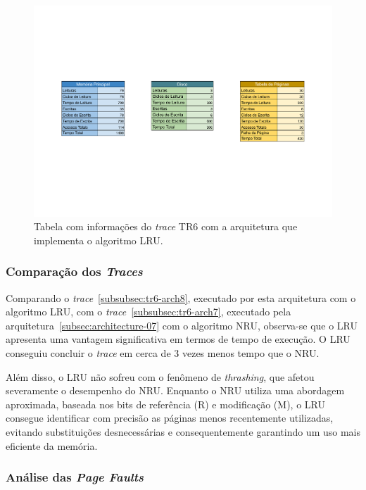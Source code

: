 \documentclass[
	12pt,				%
	oneside,   	        %
	a4paper,			%
	english,			%
	french,				%
	spanish,			%
	brazil,				%
	]{pacotes/abntex2}
\begin{document}
\begin{figure}[H]
  \centering
  \includegraphics[scale=0.5]{figuras/Architecture08-TLB(none) TR6.pdf}
  \caption{Tabela com informações do \textit{trace} TR6 com a arquitetura que implementa o algoritmo LRU.}
  \label{fig:tr6-arch08}
\end{figure}

\subsubsection{Comparação dos \textit{Traces}}
\label{subsubsec:comp-traces-arch8}

Comparando o \textit{trace}~\ref{subsubsec:tr6-arch8}, executado por esta arquitetura com o algoritmo LRU, com o \textit{trace}~\ref{subsubsec:tr6-arch7}, executado pela arquitetura~\ref{subsec:architecture-07} com o algoritmo NRU, observa-se que o LRU apresenta uma vantagem significativa em termos de tempo de execução. O LRU conseguiu concluir o \textit{trace} em cerca de 3 vezes menos tempo que o NRU. 

Além disso, o LRU não sofreu com o fenômeno de \textit{thrashing}, que afetou severamente o desempenho do NRU. Enquanto o NRU utiliza uma abordagem aproximada, baseada nos bits de referência (R) e modificação (M), o LRU consegue identificar com precisão as páginas menos recentemente utilizadas, evitando substituições desnecessárias e consequentemente garantindo um uso mais eficiente da memória.

\subsubsection{Análise das \textit{Page Faults}}
\label{subsubsec:analise-arch8}
\end{document}
